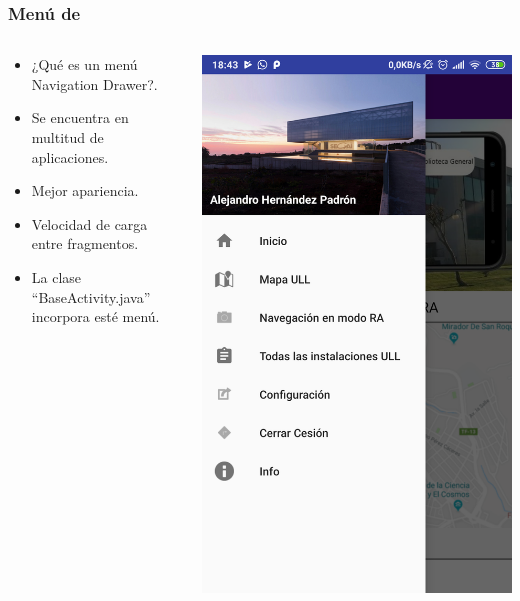 \begin{frame}
\begin{columns}
\begin{column}{0.4\textwidth}
\begin{center}
			\end{center}
		\end{column}
	\end{columns}
\end{frame}


\begin{frame}
	\frametitle{Menú de \ULLAR{}}
	\begin{columns}
		\begin{column}{0.6\textwidth}
			\begin{itemize}
				\item ¿Qué es un menú Navigation Drawer?.
				\item Se encuentra en multitud de aplicaciones.
				\item Mejor apariencia.
				\item Velocidad de carga entre fragmentos.
				\item La clase ``BaseActivity.java'' incorpora esté menú.
			\end{itemize}
			\endblock{}
		\end{column}
		\begin{column}{0.4\textwidth} 
			\vfill 
			\begin{center}
				\includegraphics[width=0.8\linewidth]{Images/menuApp}
			\end{center}
		\end{column}
	\end{columns}
\end{frame}



